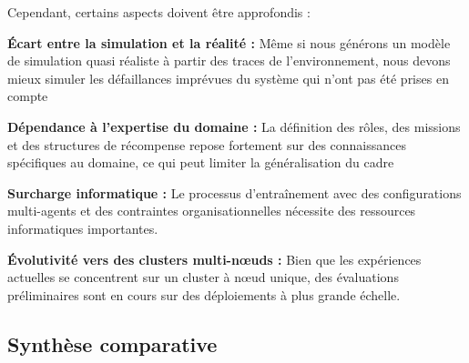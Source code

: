 Cependant, certains aspects doivent être approfondis :
\begin{enumerate*}[label=\textbf{\arabic*)}, itemjoin={;\quad }]
  \item \textbf{Écart entre la simulation et la réalité :} Même si nous générons un modèle de simulation quasi réaliste à partir des traces de l'environnement, nous devons mieux simuler les défaillances imprévues du système qui n'ont pas été prises en compte
  \item \textbf{Dépendance à l'expertise du domaine :} La définition des rôles, des missions et des structures de récompense repose fortement sur des connaissances spécifiques au domaine, ce qui peut limiter la généralisation du cadre
  \item \textbf{Surcharge informatique :} Le processus d'entraînement avec des configurations multi-agents et des contraintes organisationnelles nécessite des ressources informatiques importantes.
  \item \textbf{Évolutivité vers des clusters multi-nœuds :} Bien que les expériences actuelles se concentrent sur un cluster à nœud unique, des évaluations préliminaires sont en cours sur des déploiements à plus grande échelle.

\end{enumerate*}



\subsection{Synthèse comparative}

